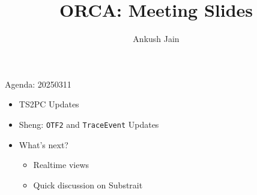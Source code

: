 \documentclass[
  ignorenonframetext,
]{beamer}
\title{ORCA: Meeting Slides}
\author{Ankush Jain}
\date{}
\institute{Mochi: 2025-03-11}
\providecommand{\tightlist}{%
  \setlength{\itemsep}{0pt}\setlength{\parskip}{0pt}}\usepackage{longtable,booktabs,array}
\begin{document}
\frame{\titlepage}


\begin{frame}[fragile]{Agenda: 20250311}
\label{agenda-20250311}
\begin{itemize}
\tightlist
\item
  TS2PC Updates
\item
  Sheng: \texttt{OTF2} and \texttt{TraceEvent} Updates
\item
  What's next?

  \begin{itemize}
  \tightlist
  \item
    Realtime views
  \item
    Quick discussion on Substrait
  \end{itemize}
\end{itemize}
\end{frame}
\end{document}
